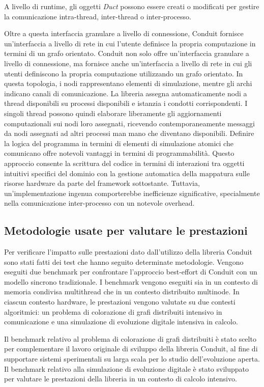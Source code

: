 \documentclass[11pt]{article}
\begin{document}
\begin{multicols*}{2}[\columnsep=1cm]
A livello di runtime, gli oggetti \textit{Duct} possono essere creati o modificati per gestire la comunicazione intra-thread, inter-thread o inter-processo.

Oltre a questa interfaccia granulare a livello di connessione, Conduit fornisce un'interfaccia a livello di rete in cui l'utente definisce la propria computazione in termini di un grafo orientato.
Conduit non solo offre un'interfaccia granulare a livello di connessione, ma fornisce anche un'interfaccia a livello di rete in cui gli utenti definiscono la propria computazione utilizzando un grafo orientato. In questa topologia, i nodi rappresentano elementi di simulazione, mentre gli archi indicano canali di comunicazione.
La libreria assegna automaticamente nodi a thread disponibili su processi disponibili e istanzia i condotti corrispondenti. I singoli thread possono quindi elaborare liberamente gli aggiornamenti computazionali sui nodi loro assegnati, ricevendo contemporaneamente messaggi da nodi assegnati ad altri processi man mano che diventano disponibili. 
Definire la logica del programma in termini di elementi di simulazione atomici che comunicano offre notevoli vantaggi in termini di programmabilità. Questo approccio consente la scrittura del codice in termini di interazioni tra oggetti intuitivi specifici del dominio  con la gestione automatica della mappatura sulle risorse hardware da parte del framework sottostante.
Tuttavia, un'implementazione ingenua comporterebbe inefficienze significative, specialmente nella comunicazione inter-processo con un notevole overhead. 

\subsection{Metodologie usate per valutare le prestazioni}
Per verificare l'impatto sulle prestazioni dato dall'utilizzo della libreria Conduit sono stati fatti dei test che hanno seguito determinate metodologie.
Vengono eseguiti due benchmark per confrontare l'approccio best-effort di Conduit con un modello sincrono tradizionale. 
I benchmark vengono eseguiti sia in un contesto di memoria condivisa multithread che in un contesto distribuito multinode. 
In ciascun contesto hardware, le prestazioni vengono valutate su due contesti algoritmici: un problema di colorazione di grafi distribuiti intensivo in comunicazione e una simulazione di evoluzione digitale intensiva in calcolo.

Il benchmark relativo al problema di colorazione di grafi distribuiti è stato scelto per complementare il lavoro originale di sviluppo della libreria Conduit, al fine di supportare sistemi sperimentali su larga scala per lo studio dell'evoluzione aperta. Il benchmark relativo alla simulazione di evoluzione digitale è stato sviluppato per valutare le prestazioni della libreria in un contesto di calcolo intensivo.


\end{multicols*}
\end{document}

